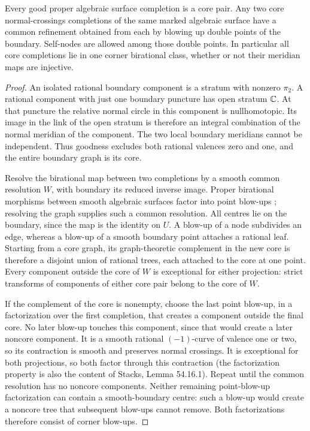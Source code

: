\begin{lemma}\label{P3a-core}
Every good proper algebraic surface completion is a core pair.  Any two core
normal-crossings completions of the same marked algebraic surface have a common
refinement obtained from each by blowing up double points of the boundary.
Self-nodes are allowed among those double points.  In particular all core
completions lie in one corner birational class, whether or not their meridian
maps are injective.
\end{lemma}
\begin{proof}
An isolated rational boundary component is a stratum with nonzero $\pi_2$.
A rational component with just one boundary puncture has open stratum $\mathbb C$.
At that puncture the relative normal circle in this component is nullhomotopic.
Its image in the link of the open stratum is therefore an integral combination
of the normal meridian of the component.  The two local boundary meridians
cannot be independent.  Thus goodness excludes both rational valences zero
and one, and the entire boundary graph is its core.

Resolve the birational map between two completions by a smooth common
resolution $W$, with boundary its reduced inverse image.  Proper birational
morphisms between smooth algebraic surfaces factor into point blow-ups
\citep[Lemma 54.17.1]{StacksSurfaceFactorization2026}; resolving the graph supplies
such a common resolution.  All centres lie on the boundary, since the map is
the identity on $U$.  A blow-up of a node subdivides an edge, whereas a blow-up
of a smooth boundary point attaches a rational leaf.  Starting from a core
graph, its graph-theoretic complement in the new core is therefore a disjoint
union of rational trees, each attached to the core at one point.  Every
component outside the core of $W$ is exceptional for either projection:
strict transforms of components of either core pair belong to the core of $W$.

If the complement of the core is nonempty, choose the last point blow-up,
in a factorization over the first completion, that creates a component outside
the final core.  No later blow-up touches this component, since that would
create a later noncore component.  It is a smooth rational $(-1)$-curve of
valence one or two, so its contraction is smooth and preserves normal crossings.
It is exceptional for both projections, so both factor through this contraction
(the factorization property is also the content of Stacks, Lemma 54.16.1).
Repeat until the common resolution has no noncore components.  Neither
remaining point-blow-up factorization can contain a smooth-boundary centre:
such a blow-up would create a noncore tree that subsequent blow-ups cannot
remove.  Both factorizations therefore consist of corner blow-ups.
\end{proof}

